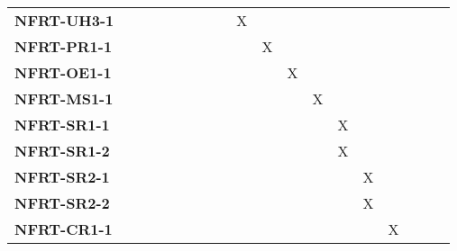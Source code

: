 \documentclass[12pt, titlepage]{article}
\begin{document}
\begin{landscape}
\begin{longtable}{|l|cccccccccccccc|}
		\textbf{NFRT-UH3-1} & ~                                                         & ~            & ~            & ~            & ~            & X            & ~            & ~            & ~            & ~            & ~            & ~            & ~            & ~            \\
		\textbf{NFRT-PR1-1} & ~                                                         & ~            & ~            & ~            & ~            & ~            & X            & ~            & ~            & ~            & ~            & ~            & ~            & ~            \\
		\textbf{NFRT-OE1-1} & ~                                                         & ~            & ~            & ~            & ~            & ~            & ~            & X            & ~            & ~            & ~            & ~            & ~            & ~            \\
		\textbf{NFRT-MS1-1} & ~                                                         & ~            & ~            & ~            & ~            & ~            & ~            & ~            & X            & ~            & ~            & ~            & ~            & ~            \\
		\textbf{NFRT-SR1-1} & ~                                                         & ~            & ~            & ~            & ~            & ~            & ~            & ~            & ~            & X            & ~            & ~            & ~            & ~            \\
		\textbf{NFRT-SR1-2} & ~                                                         & ~            & ~            & ~            & ~            & ~            & ~            & ~            & ~            & X            & ~            & ~            & ~            & ~            \\
		\textbf{NFRT-SR2-1} & ~                                                         & ~            & ~            & ~            & ~            & ~            & ~            & ~            & ~            & ~            & X            & ~            & ~            & ~            \\
		\textbf{NFRT-SR2-2} & ~                                                         & ~            & ~            & ~            & ~            & ~            & ~            & ~            & ~            & ~            & X            & ~            & ~            & ~            \\
		\textbf{NFRT-CR1-1} & ~                                                         & ~            & ~            & ~            & ~            & ~            & ~            & ~            & ~            & ~            & ~            & X            & ~            & ~            \\

\end{longtable}
\end{landscape}
\end{document}

